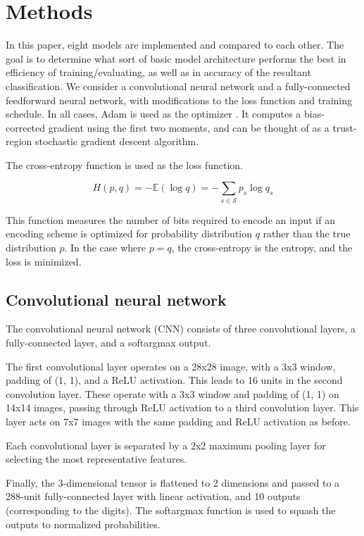 \documentclass{article}
\begin{document}
\section{Methods}

In this paper, eight models are implemented and compared to each other.
The goal is to determine what sort of basic model architecture performs the best
in efficiency of training/evaluating, as well as in accuracy of the resultant classification.
We consider a convolutional neural network and a fully-connected feedforward neural network,
with modifications to the loss function and training schedule.
In all cases, Adam is used as the optimizer \citep{kingmaAdamMethodStochastic2017}.
It computes a bias-corrected gradient using the first two moments,
and can be thought of as a trust-region stochastic gradient descent algorithm.

The cross-entropy function is used as the loss function.

\begin{equation}
  H(p, q) = - \mathbb{E}(\log q) = - \sum_{s \in \mathcal{S}} p_s \log q_s
\end{equation}

This function measures the number of bits required to encode an input
if an encoding scheme is optimized for probability distribution $q$ rather than
the true distribution $p$.
In the case where $p = q$, the cross-entropy is the entropy,
and the loss is minimized.

\subsection{Convolutional neural network}

The convolutional neural network (CNN) consists of three convolutional layers,
a fully-connected layer, and a softargmax output.

The first convolutional layer operates on a 28x28 image, with a 3x3 window,
padding of (1, 1), and a ReLU activation.
This leads to 16 units in the second convolution layer.
These operate with a 3x3 window and padding of (1, 1) on 14x14 images,
passing through ReLU activation to a third convolution layer.
This layer acts on 7x7 images with the same padding and ReLU activation as before.

Each convolutional layer is separated by a 2x2 maximum pooling layer
for selecting the most representative features.

Finally, the 3-dimensional tensor is flattened to 2 dimensions
and passed to a 288-unit fully-connected layer with linear activation,
and 10 outputs (corresponding to the digits).
The softargmax function is used to squash the outputs to normalized probabilities.
\end{document}
